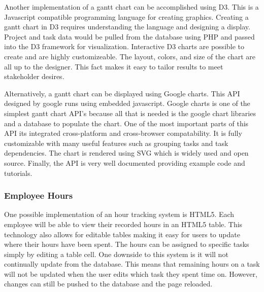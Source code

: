 \documentclass[letterpaper,10pt,titlepage,journal,compsoc,draftclsnofoot,onecolumn]{IEEEtran}
\newcommand\tab[1][1cm]{\hspace*{#1}}
\begin{document}

\tab Another implementation of a gantt chart can be accomplished using D3. This is a Javascript compatible programming language for creating graphics. Creating a gantt chart in D3 requires understanding the language and designing a display. Project and task data would be pulled from the database using PHP and passed into the D3 framework for visualization. Interactive D3 charts are possible to create and are highly customizeable. The layout, colors, and size of the chart are all up to the designer. This fact makes it easy to tailor results to meet stakeholder desires. \newline


\tab Alternatively, a gantt chart can be displayed using Google charts. This API designed by google runs using embedded javascript. Google charts is one of the simplest gantt chart API’s because all that is needed is the google chart libraries and a database to populate the chart. One of the most important parts of this API its integrated cross-platform and cross-browser compatability. It is fully customizable with many useful features such as grouping tasks and task dependencies. The chart is rendered using SVG which is widely used and open source. Finally, the API is very well documented providing example code and tutorials.\newline


\subsubsection{Employee Hours}

\tab One possible implementation of an hour tracking system is HTML5. Each employee will be able to view their recorded hours in an HTML5 table. This technology also allows for editable tables making it easy for users to update where their hours have been spent. The hours can be assigned to specific tasks simply by editing a table cell. One downside to this system is it will not continually update from the database. This means that remaining hours on a task will not be updated when the user edits which task they spent time on. However, changes can still be pushed to the database and the page reloaded. \newline
\end{document}
